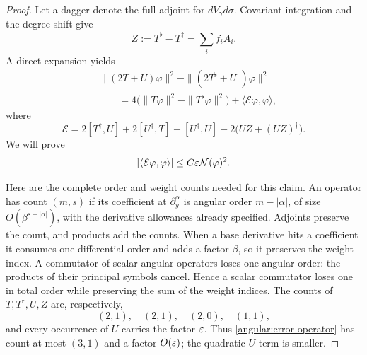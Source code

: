 \begin{proof}
Let a dagger denote the full adjoint for $dV_\gamma d\sigma$.
Covariant integration and the degree shift give
\begin{equation}\label{angular:Z-definition}
 Z:=T^\flat-T^\dagger=\sum_i f_iA_i.
\end{equation}
A direct expansion yields
\begin{equation}\label{angular:norm-comparison}
 \begin{split}
 &\|(2T+U)\varphi\|^2-
                \|(2T^\flat+U^\dagger)\varphi\|^2\\
 &\qquad=4\bigl(\|T\varphi\|^2-\|T^\flat\varphi\|^2\bigr)
                       +\langle\mathcal E\varphi,\varphi\rangle,
 \end{split}
\end{equation}
where
\begin{equation}\label{angular:error-operator}
 \mathcal E=2[T^\dagger,U]+2[U^\dagger,T]+[U^\dagger,U]
                       -2\bigl(UZ+(UZ)^\dagger\bigr).
\end{equation}
We will prove
\begin{equation}\label{angular:error-form-bound}
 |\langle\mathcal E\varphi,\varphi\rangle|
                         \le C\varepsilon\mathcal N(\varphi)^2.
\end{equation}

Here are the complete order and weight counts needed for this claim.
An operator has count $(m,s)$ if its coefficient at $\partial_y^\alpha$
is angular order $m-|\alpha|$, of size $O(\beta^{s-|\alpha|})$,
with the derivative allowances already specified.
Adjoints preserve the count, and products add the counts.  When a base
derivative hits a coefficient it consumes one differential order and
adds a factor $\beta$, so it preserves the weight index.  A commutator
of scalar angular operators loses one angular order: the products of
their principal symbols cancel.  Hence a scalar commutator loses one in
total order while preserving the sum of the weight indices.
The counts of $T,T^\dagger,U,Z$ are, respectively,
\[
 (2,1),\quad(2,1),\quad(2,0),\quad(1,1),
\]
and every occurrence of $U$ carries the factor $\varepsilon$.  Thus
\eqref{angular:error-operator} has count at most $(3,1)$ and a factor
$O(\varepsilon)$; the quadratic $U$ term is smaller.


\end{proof}
